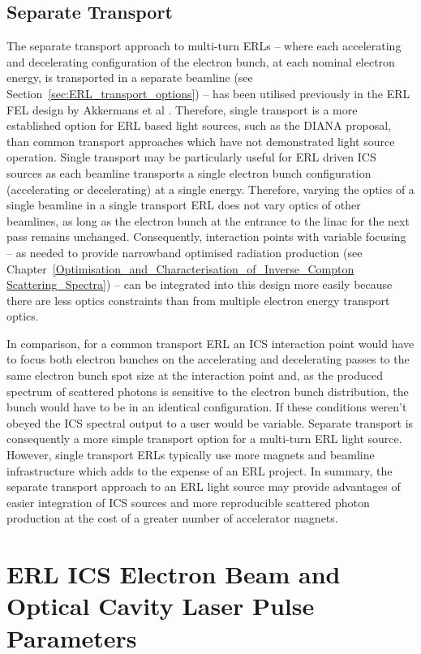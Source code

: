 \documentclass[../main.tex]{subfiles}
\begin{document}
\subsection{Separate Transport}

The separate transport approach to multi-turn ERLs -- where each accelerating and decelerating configuration of the electron bunch, at each nominal electron energy, is transported in a separate beamline (see Section~\ref{sec:ERL_transport_options}) -- has been utilised previously in the ERL FEL design by Akkermans et al \cite{akkermans2017compact}. Therefore, single transport is a more established option for ERL based light sources, such as the DIANA proposal, than common transport approaches which have not demonstrated light source operation. Single transport may be particularly useful for ERL driven ICS sources as each beamline transports a single electron bunch configuration (accelerating or decelerating) at a single energy. Therefore, varying the optics of a single beamline in a single transport ERL does not vary optics of other beamlines, as long as the electron bunch at the entrance to the linac for the next pass remains unchanged. Consequently, interaction points with variable focusing -- as needed to provide narrowband optimised radiation production (see Chapter~\ref{Optimisation_and_Characterisation_of_Inverse_Compton Scattering_Spectra}) -- can be integrated into this design more easily because there are less optics constraints than from multiple electron energy transport optics.

In comparison, for a common transport ERL an ICS interaction point would have to focus both electron bunches on the accelerating and decelerating passes to the same electron bunch spot size at the interaction point and, as the produced spectrum of scattered photons is sensitive to the electron bunch distribution, the bunch would have to be in an identical configuration. If these conditions weren't obeyed the ICS spectral output to a user would be variable. Separate transport is consequently a more simple transport option for a multi-turn ERL light source. However, single transport ERLs typically use more magnets and beamline infrastructure which adds to the expense of an ERL project. In summary, the separate transport approach to an ERL light source may provide advantages of easier integration of ICS sources and more reproducible scattered photon production at the cost of a greater number of accelerator magnets.  

\section{ERL ICS Electron Beam and Optical Cavity Laser Pulse Parameters}
\end{document}
